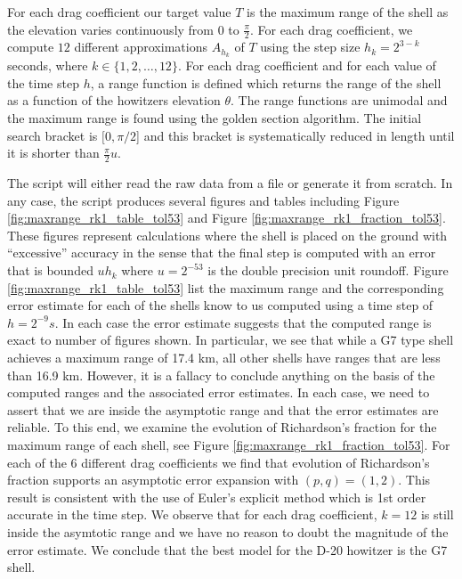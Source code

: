 \documentclass[runningheads]{llncs}
\begin{document}
For each drag coefficient our target value $T$ is the maximum range of the shell as the elevation varies continuously from $0$ to $\frac{\pi}{2}$. For each drag coefficient, we compute $12$ different approximations $A_{h_k}$ of $T$ using the step size $h_k = 2^{3-k}$ seconds, where $k \in \{1,2,\dots,12\}$.
For each drag coefficient and for each value of the time step $h$, a range function is defined which returns the range of the shell as a function of the howitzers elevation $\theta$.
The range functions are unimodal and the maximum range is found using the golden section algorithm.
The initial search bracket is $[0,\pi/2$] and this bracket is systematically reduced in length until it is shorter than $\frac{\pi}{2}u$.

The script will either read the raw data from a file or generate it from scratch. In any case, the script produces several figures and tables including Figure \ref{fig:maxrange_rk1_table_tol53} and Figure \ref{fig:maxrange_rk1_fraction_tol53}. These figures represent calculations where the shell is placed on the ground with ``excessive'' accuracy in the sense that the final step is computed with an error that is bounded $u h_{k}$ where $u = 2^{-53}$ is the double precision unit roundoff. Figure \ref{fig:maxrange_rk1_table_tol53} list the maximum range and the corresponding error estimate for each of the shells know to us computed using a time step of $h = 2^{-9} s$. In each case the error estimate suggests that the computed range is exact to number of figures shown. In particular, we see that while a G7 type shell achieves a maximum range of 17.4 km, all other shells have ranges that are less than 16.9 km. However, it is a fallacy to conclude anything on the basis of the computed ranges and the associated error estimates. In each case, we need to assert that we are inside the asymptotic range and that the error estimates are reliable. To this end, we examine the evolution of Richardson's fraction for the maximum range of each shell, see Figure \ref{fig:maxrange_rk1_fraction_tol53}. For each of the 6 different drag coefficients we find that evolution of Richardson's fraction supports an asymptotic error expansion with $(p,q) = (1,2)$. This result is consistent with the use of Euler's explicit method which is 1st order accurate in the time step. We observe that for each drag coefficient, $k=12$ is still inside the asymtotic range and we have no reason to doubt the magnitude of the error estimate. We conclude that the best model for the D-20 howitzer is the G7 shell.
\end{document}
